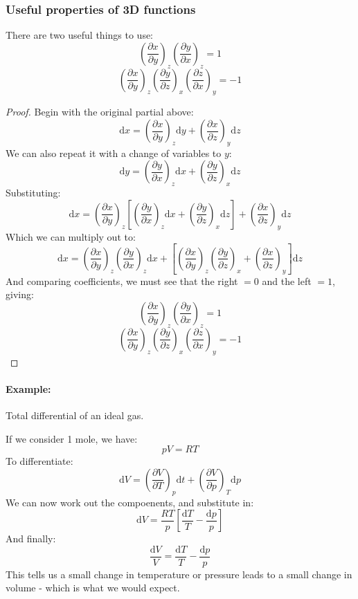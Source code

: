 \subsubsection{Useful properties of 3D functions}
There are two useful things to use:
$$
	\left(\frac{\partial x}{\partial y}\right)_z
	\left(\frac{\partial y}{\partial x}\right)_z = 1
$$
$$
	\left(\frac{\partial x}{\partial y}\right)_z
	\left(\frac{\partial y}{\partial z}\right)_x
	\left(\frac{\partial z}{\partial x}\right)_y = -1
$$
\begin{proof}
	Begin with the original partial above:
	$$
		\mathrm{d}x = \left(\frac{\partial x}{\partial y}\right)_z \mathrm{d}y
		+ \left(\frac{\partial x}{\partial z}\right)_y \mathrm{d}z
	$$
	We can also repeat it with a change of variables to $y$:
	$$
		\mathrm{d}y = \left(\frac{\partial y}{\partial x}\right)_z \mathrm{d}x
		+ \left(\frac{\partial y}{\partial z}\right)_x \mathrm{d}z
	$$
	Substituting:
	$$
		\mathrm{d}x = \left(\frac{\partial x}{\partial y}\right)_z
		\left[
			\left(\frac{\partial y}{\partial x}\right)_z \mathrm{d}x +
			\left(\frac{\partial y}{\partial z}\right)_x \mathrm{d}z
		\right] + \left(\frac{\partial x}{\partial z}\right)_y \mathrm{d}z
	$$
	Which we can multiply out to:
	$$
		\mathrm{d}x = \left(\frac{\partial x}{\partial y}\right)_z
		\left(\frac{\partial y}{\partial x}\right)_z \mathrm{d}x
		+ 
		\left[
			\left(\frac{\partial x}{\partial y}\right)_z
			\left(\frac{\partial y}{\partial z}\right)_x +
			\left(\frac{\partial x}{\partial z}\right)_y
		\right] \mathrm{d}z
	$$
	And comparing coefficients, we must see that the right $=0$ and the left
	$=1$, giving:
	$$
	    \left(\frac{\partial x}{\partial y}\right)_z
		\left(\frac{\partial y}{\partial x}\right)_z = 1
	$$
	$$
		\left(\frac{\partial x}{\partial y}\right)_z
		\left(\frac{\partial y}{\partial z}\right)_x
		\left(\frac{\partial z}{\partial x}\right)_y = -1
	$$
\end{proof}

\paragraph{Example:} Total differential of an ideal gas.

If we consider 1 mole, we have:
$$
	pV = RT
$$
To differentiate:
$$
	\mathrm{d}V = \left(\frac{\partial V}{\partial T}\right)_p \mathrm{d} t +
	\left(\frac{\partial V}{\partial p}\right)_T \mathrm{d}p
$$
We can now work out the compoenents, and substitute in:
$$
	\mathrm{d}V = \frac{RT}{p}\left[\frac{\mathrm{d}T}{T} - 
	\frac{\mathrm{d}p}{p}\right]
$$
And finally:
$$
	\frac{\mathrm{d}V}{V} = \frac{\mathrm{d}T}{T} - \frac{\mathrm{d}p}{p}
$$
This tells us a small change in temperature or pressure leads to a small change
in volume - which is what we would expect.

